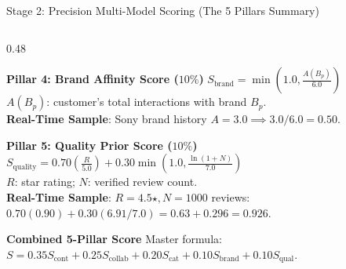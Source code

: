 \documentclass[10pt]{beamer}
\begin{document}
\begin{frame}{Stage 2: Precision Multi-Model Scoring (The 5 Pillars Summary)}
\begin{columns}[T]
\begin{column}{0.48\textwidth}
        \begin{block}{\color{brandorange}\textbf{Pillar 4: Brand Affinity Score ($10\%$)}}
            \scriptsize
            $S_{\text{brand}} = \min(1.0, \frac{A(B_p)}{6.0})$\\
            $A(B_p)$: customer's total interactions with brand $B_p$.\\
            \textbf{Real-Time Sample}: Sony brand history $A=3.0 \implies 3.0 / 6.0 = \mathbf{0.50}$.
        \end{block}
        \begin{block}{\color{brandred}\textbf{Pillar 5: Quality Prior Score ($10\%$)}}
            \scriptsize
            $S_{\text{quality}} = 0.70 \left(\frac{R}{5.0}\right) + 0.30 \min\left(1.0, \frac{\ln(1 + N)}{7.0}\right)$\\
            $R$: star rating; $N$: verified review count.\\
            \textbf{Real-Time Sample}: $R=4.5\star, N=1000$ reviews:\\
            $0.70(0.90) + 0.30(6.91/7.0) = 0.63 + 0.296 = \mathbf{0.926}$.
        \end{block}
        \begin{block}{\color{brandorange}\textbf{Combined 5-Pillar Score}}
            \tiny
            Master formula: $S = 0.35 S_{\text{cont}} + 0.25 S_{\text{collab}} + 0.20 S_{\text{cat}} + 0.10 S_{\text{brand}} + 0.10 S_{\text{qual}}$.
        \end{block}
    \end{column}
\end{columns}
\end{frame}
\end{document}
